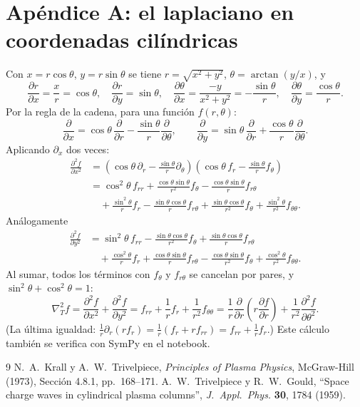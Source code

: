 \documentclass[11pt,a4paper]{article}
\begin{document}
\section{Apéndice A: el laplaciano en coordenadas cilíndricas}
Con $x=r\cos\theta$, $y=r\sin\theta$ se tiene $r=\sqrt{x^2+y^2}$, $\theta=\arctan(y/x)$, y
\[
\frac{\partial r}{\partial x}=\frac{x}{r}=\cos\theta,\quad
\frac{\partial r}{\partial y}=\sin\theta,\quad
\frac{\partial \theta}{\partial x}=\frac{-y}{x^2+y^2}=-\frac{\sin\theta}{r},\quad
\frac{\partial \theta}{\partial y}=\frac{\cos\theta}{r}.
\]
Por la regla de la cadena, para una función $f(r,\theta)$:
\[
\frac{\partial}{\partial x}=\cos\theta\,\frac{\partial}{\partial r}-\frac{\sin\theta}{r}\frac{\partial}{\partial\theta},\qquad
\frac{\partial}{\partial y}=\sin\theta\,\frac{\partial}{\partial r}+\frac{\cos\theta}{r}\frac{\partial}{\partial\theta}.
\]
Aplicando $\partial_x$ dos veces:
\begin{align*}
\frac{\partial^2f}{\partial x^2}
&=\left(\cos\theta\,\partial_r-\frac{\sin\theta}{r}\partial_\theta\right)\left(\cos\theta\,f_r-\frac{\sin\theta}{r}f_\theta\right)\\
&=\cos^2\theta\,f_{rr}+\frac{\cos\theta\sin\theta}{r^2}f_\theta-\frac{\cos\theta\sin\theta}{r}f_{r\theta}\\
&\quad+\frac{\sin^2\theta}{r}f_r-\frac{\sin\theta\cos\theta}{r}f_{r\theta}+\frac{\sin\theta\cos\theta}{r^2}f_\theta+\frac{\sin^2\theta}{r^2}f_{\theta\theta}.
\end{align*}
Análogamente
\begin{align*}
\frac{\partial^2f}{\partial y^2}
&=\sin^2\theta\,f_{rr}-\frac{\sin\theta\cos\theta}{r^2}f_\theta+\frac{\sin\theta\cos\theta}{r}f_{r\theta}\\
&\quad+\frac{\cos^2\theta}{r}f_r+\frac{\cos\theta\sin\theta}{r}f_{r\theta}-\frac{\cos\theta\sin\theta}{r^2}f_\theta+\frac{\cos^2\theta}{r^2}f_{\theta\theta}.
\end{align*}
Al sumar, todos los términos con $f_\theta$ y $f_{r\theta}$ se cancelan por pares, y $\sin^2\theta+\cos^2\theta=1$:
\[
\nabla_T^2f=\frac{\partial^2f}{\partial x^2}+\frac{\partial^2f}{\partial y^2}=f_{rr}+\frac1rf_r+\frac1{r^2}f_{\theta\theta}
=\frac1r\frac{\partial}{\partial r}\left(r\frac{\partial f}{\partial r}\right)+\frac1{r^2}\frac{\partial^2 f}{\partial\theta^2}.
\]
(La última igualdad: $\frac1r\partial_r(rf_r)=\frac1r(f_r+rf_{rr})=f_{rr}+\frac1rf_r$.) Este cálculo también se verifica con SymPy en el notebook.

\begin{thebibliography}{9}
 N.~A.~Krall y A.~W.~Trivelpiece, \textit{Principles of Plasma Physics}, McGraw-Hill (1973), Sección 4.8.1, pp.~168--171.
 A.~W.~Trivelpiece y R.~W.~Gould, ``Space charge waves in cylindrical plasma columns'', \textit{J.~Appl.~Phys.} \textbf{30}, 1784 (1959).
\end{thebibliography}
\end{document}
